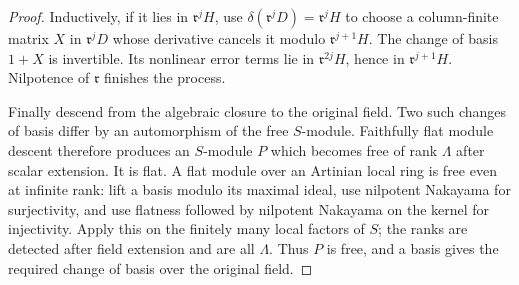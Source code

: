 \begin{proof}
Inductively, if it lies in $\mathfrak r^jH$, use
$\delta(\mathfrak r^jD)=\mathfrak r^jH$ to choose a column-finite matrix
$X$ in $\mathfrak r^jD$ whose derivative cancels it modulo
$\mathfrak r^{j+1}H$.  The change of basis $1+X$ is invertible.
Its nonlinear error terms lie in $\mathfrak r^{2j}H$, hence in
$\mathfrak r^{j+1}H$.  Nilpotence of $\mathfrak r$ finishes the process.

Finally descend from the algebraic closure to the original field.
Two such changes of basis differ by an automorphism of the free
$S$-module.  Faithfully flat module descent therefore produces an
$S$-module $P$ which becomes free of rank $\Lambda$ after scalar extension.
It is flat.  A flat module over an Artinian local ring is free even at
infinite rank: lift a basis modulo its maximal ideal, use nilpotent
Nakayama for surjectivity, and use flatness followed by nilpotent
Nakayama on the kernel for injectivity.  Apply this on the finitely many
local factors of $S$; the ranks are detected after field extension and
are all $\Lambda$.  Thus $P$ is free, and a basis gives the required
change of basis over the original field.
\end{proof}

